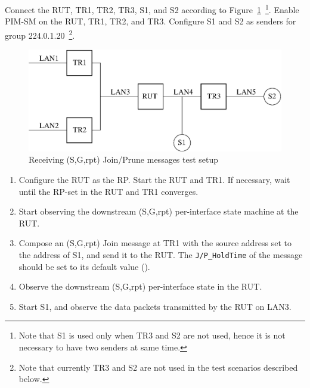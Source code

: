 \documentclass[11pt]{report}
\begin{document}
Connect the RUT, TR1, TR2, TR3, S1, and S2 according to
Figure~\ref{fig:pim_test_4_4_receiving_sg_rpt_join_prune_messages}~\footnote{Note
that S1 is used only when TR3 and S2 are not used, hence it is not necessary
to have two senders at same time.}.
Enable PIM-SM on the RUT, TR1, TR2, and TR3.
Configure S1 and S2 as senders for group 224.0.1.20~\footnote{Note that
currently TR3 and S2 are not used in the test scenarios described below.}.

\begin{figure}[htbp]
  \begin{center}
    \includegraphics[scale=0.8]{figs/pim_test_4_4_receiving_sg_rpt_join_prune_messages}
    \caption{Receiving (S,G,rpt) Join/Prune messages test setup}
    \label{fig:pim_test_4_4_receiving_sg_rpt_join_prune_messages}
  \end{center}
\end{figure}



\begin{enumerate}

  \item Configure the RUT as the RP. Start the RUT and TR1. If
  necessary, wait until the RP-set in the RUT and TR1 converges.

  \item Start observing the downstream (S,G,rpt) per-interface state
  machine at the RUT.

  \item Compose an (S,G,rpt) Join message at TR1 with the source address set
  to the address of S1, and send it to the RUT.
  The \verb=J/P_HoldTime= of the message should be set to its default
  value ({\PimsmJPHoldTime}).

  \item Observe the downstream (S,G,rpt) per-interface state in the RUT.

  \item Start S1, and observe the data packets transmitted by the RUT on
  LAN3.

\end{enumerate}
\end{document}
